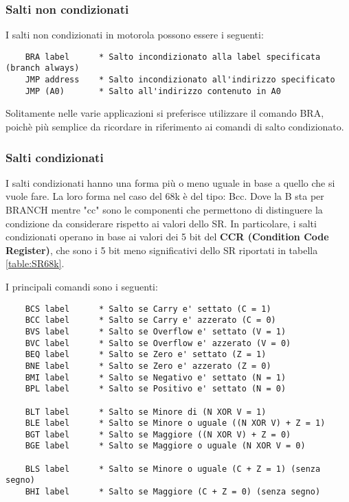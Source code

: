 \newpage
\subsubsection{Salti non condizionati}
I salti non condizionati in motorola possono essere i seguenti:
\begin{lstlisting}
    BRA label      * Salto incondizionato alla label specificata (branch always)
    JMP address    * Salto incondizionato all'indirizzo specificato
    JMP (A0)       * Salto all'indirizzo contenuto in A0
\end{lstlisting}

Solitamente nelle varie applicazioni si preferisce utilizzare il comando BRA, poichè più semplice da ricordare in riferimento ai comandi di salto condizionato.

\subsubsection{Salti condizionati}
I salti condizionati hanno una forma più o meno uguale in base a quello che si vuole fare. La loro forma nel caso del 68k è del tipo: Bcc. Dove la B sta per BRANCH mentre "cc" sono le componenti che permettono di distinguere la condizione da considerare rispetto ai valori dello SR. In particolare, i salti condizionati operano in base ai valori dei 5 bit del \textbf{CCR (Condition Code Register)}, che sono i 5 bit meno significativi dello SR riportati in tabella \ref{table:SR68k}.

I principali comandi sono i seguenti:
\begin{lstlisting}
    BCS label      * Salto se Carry e' settato (C = 1)
    BCC label      * Salto se Carry e' azzerato (C = 0)
    BVS label      * Salto se Overflow e' settato (V = 1)
    BVC label      * Salto se Overflow e' azzerato (V = 0)
    BEQ label      * Salto se Zero e' settato (Z = 1)
    BNE label      * Salto se Zero e' azzerato (Z = 0)
    BMI label      * Salto se Negativo e' settato (N = 1)
    BPL label      * Salto se Positivo e' settato (N = 0)

    BLT label      * Salto se Minore di (N XOR V = 1)
    BLE label      * Salto se Minore o uguale ((N XOR V) + Z = 1)
    BGT label      * Salto se Maggiore ((N XOR V) + Z = 0)
    BGE label      * Salto se Maggiore o uguale (N XOR V = 0)

    BLS label      * Salto se Minore o uguale (C + Z = 1) (senza segno)
    BHI label      * Salto se Maggiore (C + Z = 0) (senza segno)
\end{lstlisting}

